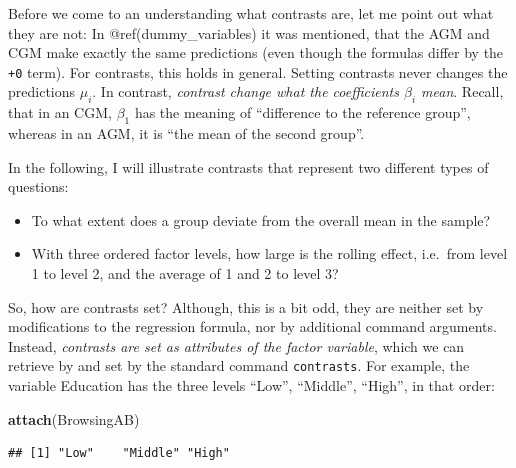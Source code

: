\documentclass[]{svmono}
\newenvironment{Shaded}{\begin{snugshade}}{\end{snugshade}}
\newcommand{\KeywordTok}[1]{\textcolor[rgb]{0.13,0.29,0.53}{\textbf{#1}}}
\newcommand{\StringTok}[1]{\textcolor[rgb]{0.31,0.60,0.02}{#1}}
\newcommand{\OperatorTok}[1]{\textcolor[rgb]{0.81,0.36,0.00}{\textbf{#1}}}
\newcommand{\NormalTok}[1]{#1}
\providecommand{\tightlist}{%
  \setlength{\itemsep}{0pt}\setlength{\parskip}{0pt}}
\theoremstyle{definition}
\theoremstyle{definition}
\theoremstyle{definition}
\theoremstyle{remark}
\begin{document}
Before we come to an understanding what contrasts are, let me point out
what they are not: In @ref(dummy\_variables) it was mentioned, that the
AGM and CGM make exactly the same predictions (even though the formulas
differ by the \texttt{+0} term). For contrasts, this holds in general.
Setting contrasts never changes the predictions \(\mu_i\). In contrast,
\emph{contrast change what the coefficients \(\beta_i\) mean}. Recall,
that in an CGM, \(\beta_1\) has the meaning of ``difference to the
reference group'', whereas in an AGM, it is ``the mean of the second
group''.

In the following, I will illustrate contrasts that represent two
different types of questions:

\begin{itemize}
\tightlist
\item
  To what extent does a group deviate from the overall mean in the
  sample?
\item
  With three ordered factor levels, how large is the rolling effect,
  i.e.~from level 1 to level 2, and the average of 1 and 2 to level 3?
\end{itemize}

So, how are contrasts set? Although, this is a bit odd, they are neither
set by modifications to the regression formula, nor by additional
command arguments. Instead, \emph{contrasts are set as attributes of the
factor variable}, which we can retrieve by and set by the standard
command \texttt{contrasts}. For example, the variable Education has the
three levels ``Low'', ``Middle'', ``High'', in that order:

\begin{Shaded}
\begin{Highlighting}[]
\KeywordTok{attach}\NormalTok{(BrowsingAB)}
\end{Highlighting}
\end{Shaded}

\begin{Shaded}
\end{Shaded}

\begin{verbatim}
## [1] "Low"    "Middle" "High"
\end{verbatim}

\begin{Shaded}
\end{Shaded}
\end{document}
